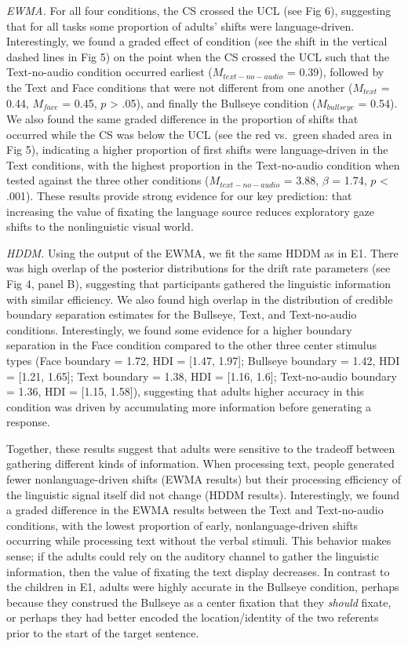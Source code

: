 \documentclass[10pt, letterpaper]{article}
\begin{document}
\emph{EWMA.} For all four conditions, the CS crossed the UCL (see Fig
6), suggesting that for all tasks some proportion of adults' shifts were
language-driven. Interestingly, we found a graded effect of condition
(see the shift in the vertical dashed lines in Fig 5) on the point when
the CS crossed the UCL such that the Text-no-audio condition occurred
earliest (\(M_{text-no-audio}\) = 0.39), followed by the Text and Face
conditions that were not different from one another (\(M_{text}\) =
0.44, \(M_{face}\) = 0.45, \(p\) \textgreater{} .05), and finally the
Bullseye condition (\(M_{bullseye}\) = 0.54). We also found the same
graded difference in the proportion of shifts that occurred while the CS
was below the UCL (see the red vs.~green shaded area in Fig 5),
indicating a higher proportion of first shifts were language-driven in
the Text conditions, with the highest proportion in the Text-no-audio
condition when tested against the three other conditions
(\(M_{text-no-audio}\) = 3.88, \(\beta\) = 1.74, \(p\) \textless{}
.001). These results provide strong evidence for our key prediction:
that increasing the value of fixating the language source reduces
exploratory gaze shifts to the nonlinguistic visual world.

\emph{HDDM.} Using the output of the EWMA, we fit the same HDDM as in
E1. There was high overlap of the posterior distributions for the drift
rate parameters (see Fig 4, panel B), suggesting that participants
gathered the linguistic information with similar efficiency. We also
found high overlap in the distribution of credible boundary separation
estimates for the Bullseye, Text, and Text-no-audio conditions.
Interestingly, we found some evidence for a higher boundary separation
in the Face condition compared to the other three center stimulus types
(Face boundary = 1.72, HDI = {[}1.47, 1.97{]}; Bullseye boundary = 1.42,
HDI = {[}1.21, 1.65{]}; Text boundary = 1.38, HDI = {[}1.16, 1.6{]};
Text-no-audio boundary = 1.36, HDI = {[}1.15, 1.58{]}), suggesting that
adults higher accuracy in this condition was driven by accumulating more
information before generating a response.

Together, these results suggest that adults were sensitive to the
tradeoff between gathering different kinds of information. When
processing text, people generated fewer nonlanguage-driven shifts (EWMA
results) but their processing efficiency of the linguistic signal itself
did not change (HDDM results). Interestingly, we found a graded
difference in the EWMA results between the Text and Text-no-audio
conditions, with the lowest proportion of early, nonlanguage-driven
shifts occurring while processing text without the verbal stimuli. This
behavior makes sense; if the adults could rely on the auditory channel
to gather the linguistic information, then the value of fixating the
text display decreases. In contrast to the children in E1, adults were
highly accurate in the Bullseye condition, perhaps because they
construed the Bullseye as a center fixation that they \emph{should}
fixate, or perhaps they had better encoded the location/identity of the
two referents prior to the start of the target sentence.
\end{document}
